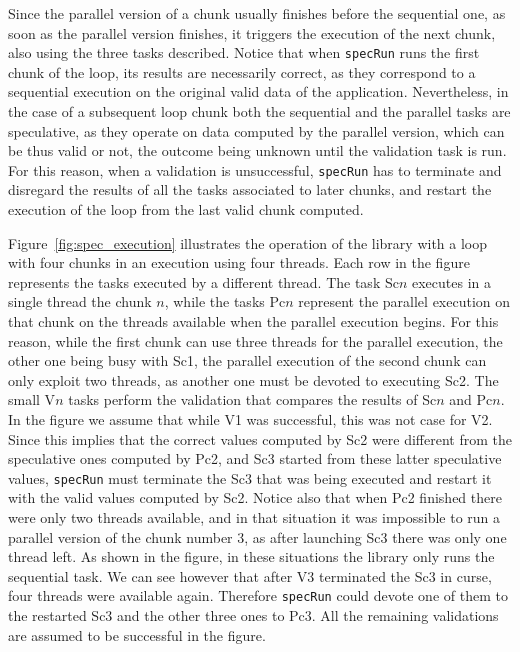 \documentclass[11pt,a4paper]{article}
\begin{document}
	Since the parallel version of a chunk usually finishes before the sequential one, as soon as the parallel version finishes, it triggers the execution of the next chunk, also using the three tasks described. Notice that when {\tt specRun} runs the first chunk of the loop, its results are necessarily correct, as they correspond to a sequential execution on the original valid data of the application. Nevertheless, in the case of a subsequent loop chunk both the sequential and the parallel tasks are speculative, as they operate on data computed by the parallel version, which can be thus valid or not, the outcome being unknown until the validation task is run. For this reason, when a validation is unsuccessful, {\tt specRun} has to terminate and disregard the results of all the tasks associated to later chunks, and restart the execution of the loop from the last valid chunk computed.
	
	Figure~\ref{fig:spec_execution} illustrates the operation of the library with a loop with four chunks in an execution using four threads. Each row in the figure represents the tasks executed by a different thread. The task Sc$n$ executes in a single thread the chunk $n$, while the tasks Pc$n$ represent the parallel execution on that chunk on the threads available when the parallel execution begins. For this reason, while the first chunk can use three threads for the parallel execution, the other one being busy with Sc1, the parallel execution of the second chunk can only exploit two threads, as another one must be devoted to executing Sc2. The small V$n$ tasks perform the validation that compares the results of Sc$n$ and Pc$n$. In the figure we assume that while V1 was successful, this was not case for V2. Since this implies that the correct values computed by Sc2 were different from the speculative ones computed by Pc2, and Sc3 started from these latter speculative values, {\tt specRun} must terminate the Sc3 that was being executed and restart it with the valid values computed by Sc2. Notice also that when Pc2 finished there were only two threads available, and in that situation it was impossible to run a parallel version of the chunk number 3, as after launching Sc3 there was only one thread left. As shown in the figure, in these situations the library only runs the sequential task. We can see however that after V3 terminated the Sc3 in curse, four threads were available again. Therefore {\tt specRun} could devote one of them to the restarted Sc3 and the other three ones to Pc3. All the remaining validations are assumed to be successful in the figure.
	
\end{document}
